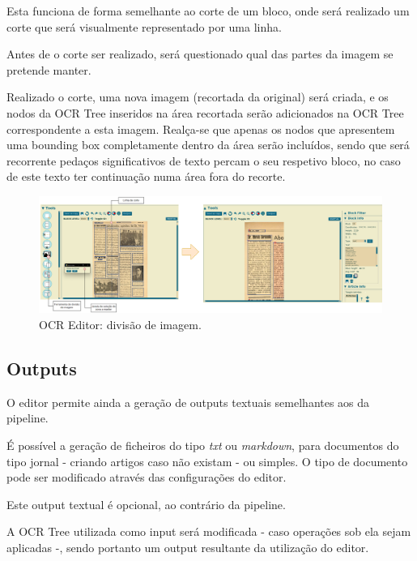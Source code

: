 Esta funciona de forma semelhante ao corte de um bloco, onde será realizado um corte que será visualmente representado por uma linha.


Antes de o corte ser realizado, será questionado qual das partes da imagem se pretende manter.

Realizado o corte, uma nova imagem (recortada da original) será criada, e os nodos da OCR Tree inseridos na área recortada serão adicionados na OCR Tree correspondente a esta imagem. Realça-se que apenas os nodos que apresentem uma bounding box completamente dentro da área serão incluídos, sendo que será recorrente pedaços significativos de texto percam o seu respetivo bloco, no caso de este texto ter continuação numa área fora do recorte.

\begin{figure}[H]
	\centering
	\hspace*{-1.8cm}
	\includegraphics[width=1.2\textwidth]{images/ilustracoes/ocr_editor_split_image.png}
	\caption{OCR Editor: divisão de imagem.}
	\label{fig:ocr_editor_split_image}
\end{figure}



\subsection{Outputs}

O editor permite ainda a geração de outputs textuais semelhantes aos da pipeline. 

É possível a geração de ficheiros do tipo \textit{txt} ou \textit{markdown}, para documentos do tipo jornal - criando artigos caso não existam - ou simples. O tipo de documento pode ser modificado através das configurações do editor.

Este output textual é opcional, ao contrário da pipeline.

A OCR Tree utilizada como input será modificada - caso operações sob ela sejam aplicadas -, sendo portanto um output resultante da utilização do editor. 

